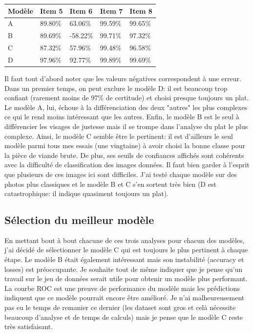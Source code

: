 \documentclass[a4paper,12pt]{report}
\begin{document}
      \begin{table}[!h]
      \centering
        \begin{tabular}{lllll}
          \hline
          Modèle & Item 5 & Item 6 & Item 7 & Item 8 \\
          \hline
          A & 89.80\% & 63.06\% & 99.59\% & 99.65\% \\
          B & 89.69\% & -58.22\% & 99.71\% & 97.32\% \\
          C & 87.32\% & 57.96\% & 99.48\% & 96.58\% \\
          D & 97.96\% & 92.77\% & 99.89\% & 99.69\% \\
          \hline
        \end{tabular}
      \end{table}
      \medbreak
      Il faut tout d'abord noter que les valeurs négatives correspondent à une erreur. Dans un premier temps, on peut exclure le modèle D: il est beaucoup trop confiant (rarement moins de 97\% de certitude) et choisi presque toujours un plat.
      \medbreak
      Le modèle A, lui, échoue à la différenciation des deux "autres" les plus complexes ce qui le rend moins intéressant que les autres.
      \medbreak
      Enfin, le modèle B est le seul à différencier les visages de justesse mais il se trompe dans l'analyse du plat le plus complexe. Ainsi, le modèle C semble être le pertinent: il est d'ailleurs le seul modèle parmi tous mes essais (une vingtaine) à avoir choisi la bonne classe pour la pièce de viande brute. De plus, ses seuils de confiances affichés sont cohérents avec la difficulté de classification des images données.
      \medbreak
      Il faut bien garder à l'esprit que plusieurs de ces images ici sont difficiles. J'ai testé chaque modèle sur des photos plus classiques et le modèle B et C s'en sortent très bien (D est catastrophique: il indique quasiment toujours un plat).

      \subsection{Sélection du meilleur modèle}
      En mettant bout à bout chacune de ces trois analyses pour chacun des modèles, j'ai décidé de sélectionner le modèle C qui est toujours le plus pertinent à chaque étape. Le modèle B était également intéressant mais son instabilité (accuracy et losses) est préoccupante.
      \medbreak
      Je souhaite tout de même indiquer que je pense qu'un travail sur le jeu de données serait utile pour obtenir un modèle plus performant. La courbe ROC est une preuve de performance du modèle mais les prédictions indiquent que ce modèle pourrait encore être amélioré. Je n'ai malheureusement pas eu le temps de remanier ce dernier (les dataset sont gros et celà nécessite beaucoup d'analyse et de temps de calculs) mais je pense que le modèle C reste très satisfaisant.
\end{document}
